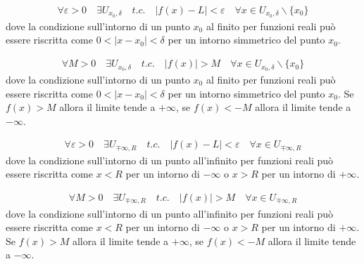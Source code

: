 \documentclass[letterpaper,10pt,english]{jupyterBook}
\begin{document}
\sphinxAtStartPar
{}
\begin{equation*}
\begin{split}\forall \varepsilon > 0 \quad \exists U_{x_0,\delta} \quad {t.c.} \quad |f(x) - L| < \varepsilon \quad \forall x \in U_{x_0, \delta} \backslash \{x_0\}\end{split}
\end{equation*}
\sphinxAtStartPar
dove la condizione sull’intorno di un punto \(x_0\) al finito per funzioni reali può essere riscritta come \(0 < | x - x_0 | <  \delta\) per un intorno simmetrico del punto \(x_0\).

\sphinxAtStartPar
{}
\begin{equation*}
\begin{split}\forall M > 0 \quad \exists U_{x_0,\delta} \quad {t.c.} \quad |f(x)| > M \quad \forall x \in U_{x_0, \delta} \backslash \{x_0\}\end{split}
\end{equation*}
\sphinxAtStartPar
dove la condizione sull’intorno di un punto \(x_0\) al finito per funzioni reali può essere riscritta come \(0 < | x - x_0 | <  \delta\) per un intorno simmetrico del punto \(x_0\). Se \(f(x) > M\) allora il limite tende a \(+\infty\), se \(f(x) < -M\) allora il limite tende a \(-\infty\).

\sphinxAtStartPar
{}
\begin{equation*}
\begin{split}\forall \varepsilon > 0 \quad \exists U_{\mp\infty,R} \quad {t.c.} \quad |f(x) - L| < \varepsilon \quad \forall x \in U_{\mp\infty, R}\end{split}
\end{equation*}
\sphinxAtStartPar
dove la condizione sull’intorno di un punto all’infinito per funzioni reali può essere riscritta come \(x < R\) per un intorno di \(-\infty\) o \(x > R\) per un intorno di \(+\infty\).

\sphinxAtStartPar
{}
\begin{equation*}
\begin{split}\forall M > 0 \quad \exists U_{\mp \infty, R} \quad {t.c.} \quad |f(x)| > M \quad \forall x \in U_{\mp \infty, R}\end{split}
\end{equation*}
\sphinxAtStartPar
dove la condizione sull’intorno di un punto all’infinito per funzioni reali può essere riscritta come \(x < R\) per un intorno di \(-\infty\) o \(x > R\) per un intorno di \(+\infty\). Se \(f(x) > M\) allora il limite tende a \(+\infty\), se \(f(x) < -M\) allora il limite tende a \(-\infty\).
\end{document}
